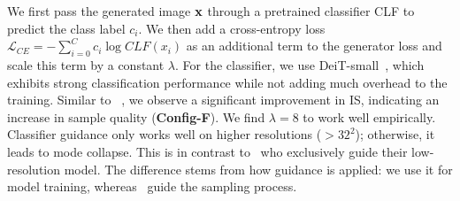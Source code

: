 We first pass the generated image $\mathbf{x}$ through a pretrained classifier CLF to predict the class label $c_i$. We then add a cross-entropy loss $\mathcal{L}_{CE} = -\sum_{i=0}^{C} c_i \log CLF({x}_i) $ as an additional term to the generator loss and scale this term by a constant $\lambda$. For the classifier, we use DeiT-small~\cite{Touvron2021ICML}, which exhibits strong classification performance while not adding much overhead to the training. Similar to ~\cite{Dhariwal2021NEURIPS}, we observe a significant improvement in IS, indicating an increase in sample quality (\textbf{Config-F}).
We find $\lambda=8$ to work well empirically.
Classifier guidance only works well on higher resolutions ($>32^2$); otherwise, it leads to mode collapse. This is in contrast to~\cite{Dhariwal2021NEURIPS} who exclusively guide their low-resolution model. The difference stems from how guidance is applied: we use it for model training, whereas~\cite{Dhariwal2021NEURIPS} guide the sampling process.